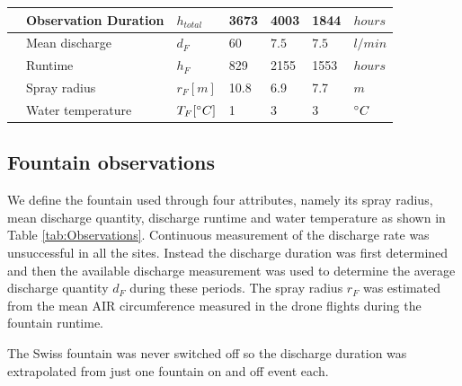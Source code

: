 \documentclass[utf8]{frontiersSCNS} %
\begin{document}
\begin{table}
\begin{tabular}{@{}|lllllll|@{}}
		\multicolumn{1}{|l|}{} & Observation Duration        & $h_{total} $        & 3673          & 4003
		                       & 1844                        & $hours$                                                                         \\\bottomrule
		\multicolumn{1}{|l|}{\multirow{4}{*}{\rotatebox[origin=c]{90}{Fountain}}}
		                       & Mean discharge              & $d_F     $          & $60$          & $7.5$        &
		$7.5$                  & $l/min$                                                                                                       \\
		\multicolumn{1}{|l|}{} & Runtime                     & $h_F $              & 829           & 2155
		                       & 1553                        & $hours$                                                                         \\
		\multicolumn{1}{|l|}{} & Spray radius                & $r_{F} [m]$         & 10.8          & 6.9
		                       & 7.7                         & $m$                                                                             \\
		\multicolumn{1}{|l|}{} & Water temperature           & $T_{F} [\degree C]$ & 1             & 3
		                       & 3                           & $\degree C$                                                                     \\\midrule
	\end{tabular}
\end{table}


\subsection{Fountain observations}

We define the fountain used through four attributes, namely its spray radius, mean discharge quantity, discharge
runtime and water temperature as shown in Table \ref{tab:Observations}. Continuous measurement of the discharge
rate was unsuccessful in all the sites. Instead the discharge duration was first determined and then the available
discharge measurement was used to determine the average discharge quantity $d_F$ during these periods. The spray radius $r_F$ was estimated from the mean AIR circumference measured in the drone flights
during the fountain runtime.

The Swiss fountain was never switched off so the discharge duration was extrapolated from just one fountain on and
off event each.
\end{document}
